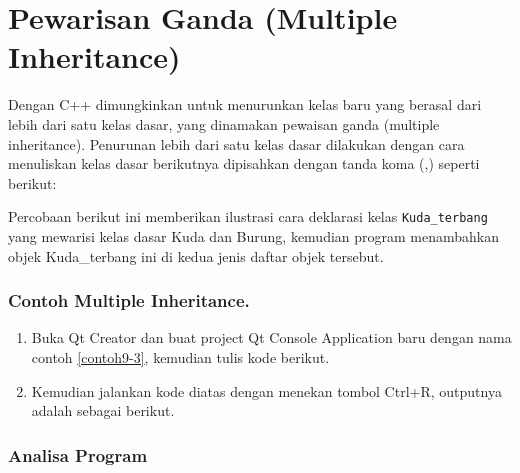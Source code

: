 \section{Pewarisan Ganda (Multiple
Inheritance)}\label{pewarisan-ganda-multiple-inheritance}

Dengan C++ dimungkinkan untuk menurunkan kelas baru yang berasal dari
lebih dari satu kelas dasar, yang dinamakan pewaisan ganda (multiple
inheritance). Penurunan lebih dari satu kelas dasar dilakukan dengan
cara menuliskan kelas dasar berikutnya dipisahkan dengan tanda koma (,)
seperti berikut:



Percobaan berikut ini memberikan ilustrasi cara deklarasi kelas
\texttt{Kuda\_terbang} yang mewarisi kelas dasar Kuda dan Burung,
kemudian program menambahkan objek Kuda\_terbang ini di kedua jenis
daftar objek tersebut.

\subsubsection*{Contoh Multiple Inheritance.}

\begin{enumerate}

\item
  Buka Qt Creator dan buat project Qt Console Application baru dengan
  nama contoh \ref{contoh9-3}, kemudian tulis kode berikut.




\item
  Kemudian jalankan kode diatas dengan menekan tombol Ctrl+R, outputnya
  adalah sebagai berikut.
\end{enumerate}

\begin{figure}[htbp]
\centering
{}

\end{figure}

\subsubsection*{Analisa Program}

